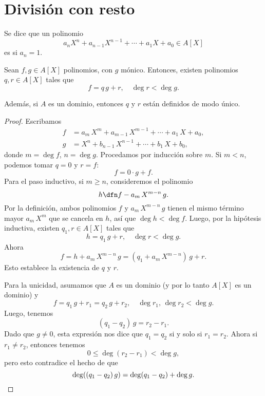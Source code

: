 
\section{División con resto}

\begin{definicion}
  Se dice que un polinomio
  $$a_n X^n + a_{n-1} X^{n-1} + \cdots + a_1 X + a_0 \in A [X]$$
  es  si $a_n = 1$.
\end{definicion}

\begin{teorema}
  \label{thm:division-con-resto}
  Sean $f, g \in A [X]$ polinomios, con $g$ mónico. Entonces, existen polinomios
  $q, r \in A [X]$ tales que
  $$f = q\,g + r, \quad \deg r < \deg g.$$

  Además, si $A$ es un dominio, entonces $q$ y $r$ están definidos de modo
  único.

  \begin{proof}
    Escribamos
    \begin{align*}
      f & = a_m\,X^m + a_{m-1}\,X^{m-1} + \cdots + a_1\,X + a_0,\\
      g & = X^n + b_{n-1}\,X^{n-1} + \cdots + b_1\,X + b_0,
    \end{align*}
    donde $m = \deg f$, $n = \deg g$. Procedamos por inducción sobre $m$. Si
    $m < n$, podemos tomar $q = 0$ y $r = f$:
    $$f = 0\cdot g + f.$$
    Para el paso inductivo, si $m \ge n$, consideremos el polinomio
    \begin{equation}
      \label{eqn:division-con-resto-paso-inductivo}
      h \dfn f - a_m\,X^{m-n}\,g.
    \end{equation}
    Por la definición, ambos polinomios $f$ y $a_m\,X^{m-n}\,g$ tienen el mismo
    término mayor $a_m\,X^m$ que se cancela en $h$, así que $\deg h < \deg
    f$. Luego, por la hipótesis inductiva, existen $q_1, r \in A [X]$ tales que
    $$h = q_1\,g + r, \quad \deg r < \deg g.$$
    Ahora
    $$f = h + a_m\,X^{m-n}\,g = (q_1 + a_m\,X^{m-n})\,g + r.$$
    Esto establece la existencia de $q$ y $r$.

    Para la unicidad, asumamos que $A$ es un dominio (y por lo tanto $A [X]$ es
    un dominio) y
    $$f = q_1\,g + r_1 = q_2\,g + r_2, \quad \deg r_1, \, \deg r_2 < \deg g.$$
    Luego, tenemos
    $$(q_1 - q_2)\,g = r_2 - r_1.$$
    Dado que $g \ne 0$, esta expresión nos dice que $q_1 = q_2$ si y solo si
    $r_1 = r_2$. Ahora si $r_1 \ne r_2$, entonces tenemos
    $$0 \le \deg (r_2 - r_1) < \deg g,$$
    pero esto contradice el hecho de que
    \[ \deg ((q_1 - q_2)\,g) = \deg (q_1 - q_2) + \deg g. \qedhere \]
  \end{proof}
\end{teorema}

